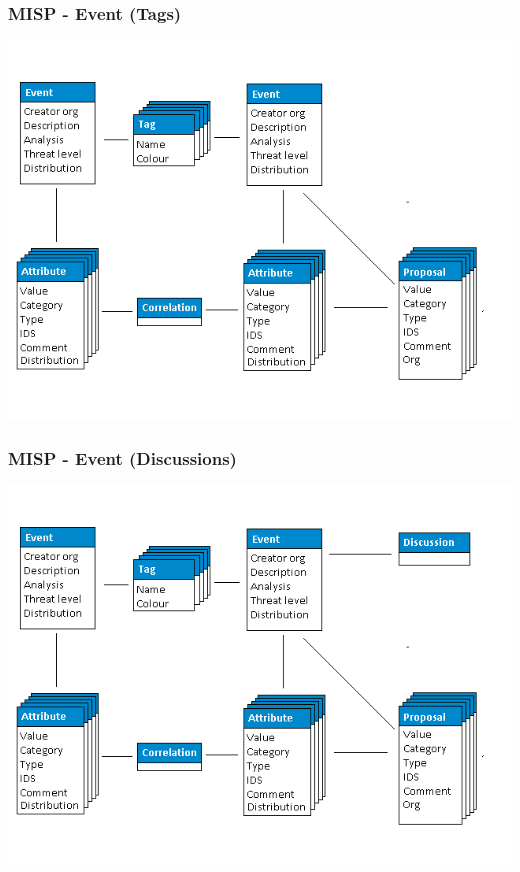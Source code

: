 \begin{frame}
    \frametitle{MISP - Event (Tags)}
    \includegraphics[scale=0.45]{screenshots/datamodel5.png}
\end{frame}

\begin{frame}
    \frametitle{MISP - Event (Discussions)}
    \includegraphics[scale=0.45]{screenshots/datamodel6.png}
\end{frame}

